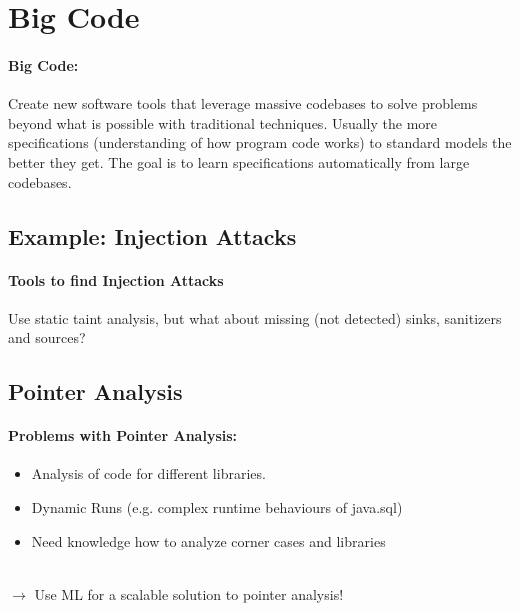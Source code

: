 \section{Big Code}
\paragraph{Big Code:} Create new software tools that leverage massive codebases to solve
problems beyond what is possible with traditional techniques. Usually the more specifications (understanding of how program code works) to standard models the better they get. The goal is to learn specifications automatically from large codebases.
\subsection{Example: Injection Attacks}
\paragraph{Tools to find Injection Attacks}
Use static taint analysis, but what about missing (not detected) sinks, sanitizers and sources? \\

\begin{minipage}{0.9\linewidth}
    \centering      
    \def\svgwidth{\columnwidth}
        
\end{minipage}

\subsection{Pointer Analysis}
\paragraph{Problems with Pointer Analysis:}
\begin{itemize}
    \item Analysis of code for different libraries.
    \item Dynamic Runs (e.g. complex runtime behaviours of java.sql)
    \item Need knowledge how to analyze corner cases and libraries
\end{itemize}
\\
$\rightarrow$ Use ML for a scalable solution to pointer analysis!

